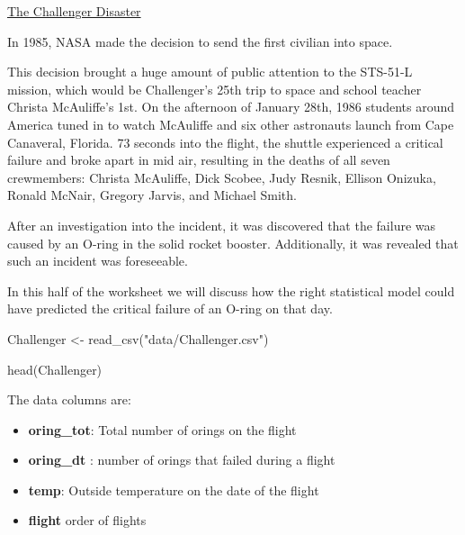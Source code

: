 \documentclass[
]{book}
\newenvironment{Shaded}{\begin{snugshade}}{\end{snugshade}}
\newcommand{\FunctionTok}[1]{\textcolor[rgb]{0.00,0.00,0.00}{#1}}
\newcommand{\NormalTok}[1]{#1}
\newcommand{\OtherTok}[1]{\textcolor[rgb]{0.56,0.35,0.01}{#1}}
\newcommand{\StringTok}[1]{\textcolor[rgb]{0.31,0.60,0.02}{#1}}
\begin{document}
\href{https://en.wikipedia.org/wiki/Space_Shuttle_Challenger_disaster\#O-ring_concerns}{The Challenger Disaster}

In 1985, NASA made the decision to send the first civilian into space.

This decision brought a huge amount of public attention to the STS-51-L mission, which would be Challenger's 25th trip to space and school teacher Christa McAuliffe's 1st. On the afternoon of January 28th, 1986 students around America tuned in to watch McAuliffe and six other astronauts launch from Cape Canaveral, Florida. 73 seconds into the flight, the shuttle experienced a critical failure and broke apart in mid air, resulting in the deaths of all seven crewmembers: Christa McAuliffe, Dick Scobee, Judy Resnik, Ellison Onizuka, Ronald McNair, Gregory Jarvis, and Michael Smith.

After an investigation into the incident, it was discovered that the failure was caused by an O-ring in the solid rocket booster. Additionally, it was revealed that such an incident was foreseeable.

In this half of the worksheet we will discuss how the right statistical model could have predicted the critical failure of an O-ring on that day.

\begin{Shaded}
\begin{Highlighting}[]
\NormalTok{Challenger }\OtherTok{\textless{}{-}} \FunctionTok{read\_csv}\NormalTok{(}\StringTok{"data/Challenger.csv"}\NormalTok{)}
\end{Highlighting}
\end{Shaded}

\begin{Shaded}
\begin{Highlighting}[]
\FunctionTok{head}\NormalTok{(Challenger)}
\end{Highlighting}
\end{Shaded}

The data columns are:

\begin{itemize}
\item
  \textbf{oring\_tot}: Total number of orings on the flight
\item
  \textbf{oring\_dt} : number of orings that failed during a flight
\item
  \textbf{temp}: Outside temperature on the date of the flight
\item
  \textbf{flight} order of flights
\end{itemize}
\end{document}
